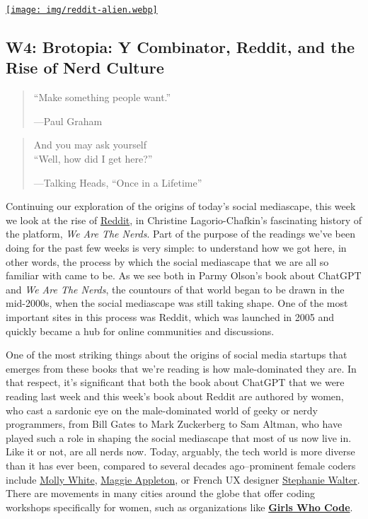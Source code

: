 \documentclass[
  letterpaper,
  DIV=11,
  numbers=noendperiod,
  oneside]{scrartcl}
\author{}
\date{}
\begin{document}
\pagestyle{mystyle}


\href{https://www.wired.com/2015/06/no-matter-reddit-going-alienate-people/}{\texttt{[image: img/reddit-alien.webp]}}

\subsection{W4: Brotopia: Y Combinator, Reddit, and the Rise of Nerd
Culture}\label{w4-brotopia-y-combinator-reddit-and-the-rise-of-nerd-culture}

\begin{quote}
``Make something people want.''

---Paul Graham
\end{quote}

\begin{quote}
And you may ask yourself\\
``Well, how did I get here?''

---Talking Heads, ``Once in a Lifetime''
\end{quote}

Continuing our exploration of the origins of today's social mediascape,
this week we look at the rise of \href{https://www.reddit.com/}{Reddit},
in Christine Lagorio-Chafkin's fascinating history of the platform,
\emph{We Are The Nerds}. Part of the purpose of the readings we've been
doing for the past few weeks is very simple: to understand how we got
here, in other words, the process by which the social mediascape that we
are all so familiar with came to be. As we see both in Parmy Olson's
book about ChatGPT and \emph{We Are The Nerds}, the countours of that
world began to be drawn in the mid-2000s, when the social mediascape was
still taking shape. One of the most important sites in this process was
Reddit, which was launched in 2005 and quickly became a hub for online
communities and discussions.

One of the most striking things about the origins of social media
startups that emerges from these books that we're reading is how
male-dominated they are. In that respect, it's significant that both the
book about ChatGPT that we were reading last week and this week's book
about Reddit are authored by women, who cast a sardonic eye on the
male-dominated world of geeky or nerdy programmers, from Bill Gates to
Mark Zuckerberg to Sam Altman, who have played such a role in shaping
the social mediascape that most of us now live in. Like it or not, are
all nerds now. Today, arguably, the tech world is more diverse than it
has ever been, compared to several decades ago--prominent female coders
include \href{https://mollywhite.net/}{Molly White},
\href{https://maggieappleton.com/}{Maggie Appleton}, or French UX
designer \href{https://stephaniewalter.com/}{Stephanie Walter}. There
are movements in many cities around the globe that offer coding
workshops specifically for women, such as organizations like
\href{https://girlswhocode.com/}{\textbf{Girls Who Code}}.
\end{document}

